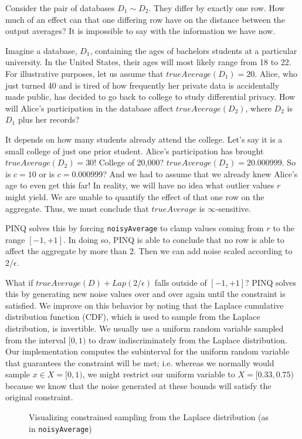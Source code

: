 \documentclass[12pt]{report}
\begin{document}
Consider the pair of databases $D_1 \sim D_2$.
They differ by exactly one row.
How much of an effect can that one differing row have on the distance between the output averages?
It is impossible to say with the information we have now.

Imagine a database, $D_1$, containing the ages of bachelors students at a particular university.
In the United States, their ages will most likely range from 18 to 22.
For illustrative purposes, let us assume that $trueAverage(D_1) = 20$.
Alice, who just turned 40 and is tired of how frequently her private data is accidentally made public, has decided to go back to college to study differential privacy.
How will Alice's participation in the database affect $trueAverage(D_2)$, where $D_2$ is $D_1$ plus her records?

It depends on how many students already attend the college.
Let's say it is a small college of just one prior student.
Alice's participation has brought $trueAverage(D_2) = 30$!
College of 20,000?
$trueAverage(D_2) = 20.000999$.
So is $c=10$ or is $c=0.000999$?
And we had to assume that we already knew Alice's age to even get this far!
In reality, we will have no idea what outlier values $r$ might yield.
We are unable to quantify the effect of that one row on the aggregate.
Thus, we must conclude that $trueAverage$ is $\infty$-sensitive.

PINQ solves this by forcing \texttt{noisyAverage} to clamp values coming from $r$ to the range $[-1,+1]$.
In doing so, PINQ is able to conclude that no row is able to affect the aggregate by more than 2.
Then we can add noise scaled according to $2/\epsilon$.

What if $trueAverage(D) + Lap(2/\epsilon)$ falls outside of $[-1,+1]$?
PINQ solves this by generating new noise values over and over again until the constraint is satisfied.
We improve on this behavior by noting that the Laplace cumulative distribution function (CDF), which is used to sample from the Laplace distribution, is invertible.
We usually use a uniform random variable sampled from the interval $[0,1)$ to draw indiscriminately from the Laplace distribution.
Our implementation computes the subinterval for the uniform random variable that guarantees the constraint will be met; i.e. whereas we normally would sample $x \in X=[0,1)$, we might restrict our uniform variable to $X=[0.33,0.75)$ because we know that the noise generated at these bounds will satisfy the original constraint.

\begin{figure}
    \centering
    \def\svgwidth{\columnwidth}
    
    \caption{Visualizing constrained sampling from the Laplace distribution (as in \lstinline{noisyAverage})}
\end{figure}
\end{document}

